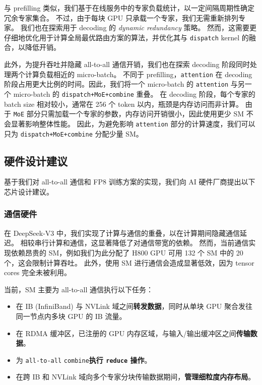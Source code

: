 \documentclass[11pt, a4paper, logo, copyright, nonumbering]{deepseek}
\newcommand{\dsviii}{DeepSeek-V3}
\begin{document}
与 prefilling 类似，我们基于在线服务中的专家负载统计，以一定间隔周期性确定冗余专家集合。
不过，由于每块 GPU 只承载一个专家，我们无需重新排列专家。
我们也在探索用于 decoding 的 \textit{dynamic redundancy} 策略。
然而，这需要更仔细地优化用于计算全局最优路由方案的算法，并优化其与 \texttt{dispatch} kernel 的融合，以降低开销。

此外，为提升吞吐并隐藏 all-to-all 通信开销，我们也在探索 decoding 阶段同时处理两个计算负载相近的 micro-batch。
不同于 prefilling，\texttt{attention} 在 decoding 阶段占用更大比例的时间。因此，我们将一个 micro-batch 的 \texttt{attention} 与另一个 micro-batch 的 \texttt{dispatch+MoE+combine} 重叠。
在 decoding 阶段，每个专家的 batch size 相对较小，通常在 256 个 token 以内，瓶颈是内存访问而非计算。
由于 \texttt{MoE} 部分只需加载一个专家的参数，内存访问开销很小，因此使用更少 SM 不会显著影响整体性能。
因此，为避免影响 \texttt{attention} 部分的计算速度，我们可以只为 \texttt{dispatch+MoE+combine} 分配少量 SM。

\subsection{硬件设计建议}
\label{fp8_hardware_design}

基于我们对 all-to-all 通信和 FP8 训练方案的实现，我们向 AI 硬件厂商提出以下芯片设计建议。

\subsubsection{通信硬件}

在 \dsviii{} 中，我们实现了计算与通信的重叠，以在计算期间隐藏通信延迟。
相较串行计算和通信，这显著降低了对通信带宽的依赖。
然而，当前通信实现依赖昂贵的 SM，例如我们为此分配了 H800 GPU 可用 132 个 SM 中的 20 个，这会限制计算吞吐。
此外，使用 SM 进行通信会造成显著低效，因为 tensor cores 完全未被利用。

当前，SM 主要为 all-to-all 通信执行以下任务：
\begin{itemize}[topsep=0pt]
    \item 
    在 IB (InfiniBand) 与 NVLink 域之间\textbf{转发数据}，同时从单块 GPU 聚合发往同一节点内多块 GPU 的 IB 流量。
    \item 
    在 RDMA 缓冲区，已注册的 GPU 内存区域，与输入/输出缓冲区之间\textbf{传输数据}。
    \item 
    为 \texttt{all-to-all} \texttt{combine}\textbf{执行 \texttt{reduce} 操作}。
    \item
    在跨 IB 和 NVLink 域向多个专家分块传输数据期间，\textbf{管理细粒度内存布局}。
\end{itemize}
\end{document}
